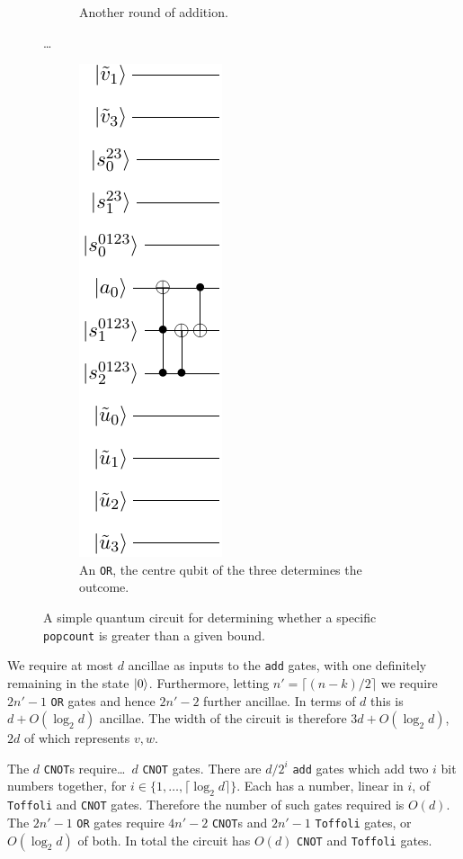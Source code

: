 \documentclass[notitlepage]{report}
\theoremstyle{definition}
\begin{document}
\begin{figure}
\begin{subfigure}{.3\textwidth}
        \caption{Another round of addition.}\label{subfig:naive_popcnt2}
    \end{subfigure}
    \dots
    \begin{subfigure}{.3\textwidth}
        \centering
        \includegraphics{popcnt_sieve_pt3}
        \caption{An \texttt{OR}, the centre qubit of the three determines the outcome.}\label{subfig:naive_popcnt3}
    \end{subfigure}
    \caption{A simple quantum circuit for determining whether a specific \texttt{popcount} is greater than a given bound.}\label{fig:naive_popcnt}
\end{figure}

We require at most $d$ ancillae as inputs to the \texttt{add} gates, with one definitely remaining in the state $\ket{0}$. Furthermore, letting $n' = \lceil (n - k)/2\rceil$ we require $2n' - 1$ \texttt{OR} gates and hence $2n' - 2$ further ancillae. In terms of $d$ this is $d + O(\log_{2}d)$ ancillae. The width of the circuit is therefore $3d + O(\log_{2}d)$, $2d$ of which represents $v, w$.

The $d$ \texttt{CNOT}s require\dots\ $d$ \texttt{CNOT} gates.
There are $d/2^{i}$ \texttt{add} gates which add two $i$ bit numbers together, for $i \in \{1, \dots, \lceil \log_{2}d\rceil\}$. Each has a number, linear in $i$, of \texttt{Toffoli} and \texttt{CNOT} gates. Therefore the number of such gates required is $O(d)$.
The $2n' - 1$ \texttt{OR} gates require $4n' - 2$ \texttt{CNOT}s and $2n' - 1$ \texttt{Toffoli} gates, or $O(\log_{2}d)$ of both.
In total the circuit has $O(d)$ \texttt{CNOT} and \texttt{Toffoli} gates.
\end{document}
